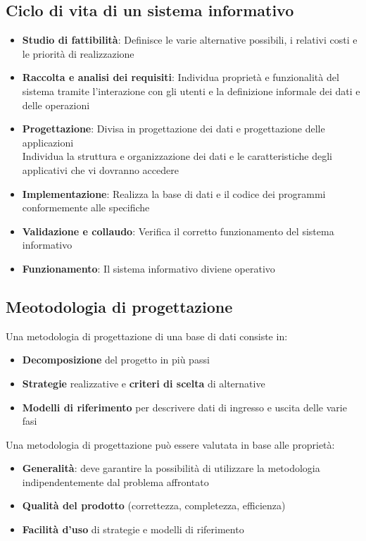 \documentclass[../main.tex]{subfiles}
\begin{document}
	\subsection{Ciclo di vita di un sistema informativo}
	\begin{itemize}
		\item \textbf{Studio di fattibilità}: Definisce le varie alternative possibili, i relativi costi e le priorità di realizzazione
		\item \textbf{Raccolta e analisi dei requisiti}: Individua proprietà e funzionalità del sistema tramite l’interazione con gli utenti e la definizione informale dei dati e delle operazioni
		\item \textbf{Progettazione}: Divisa in progettazione dei dati e progettazione delle applicazioni \\
		Individua la struttura e organizzazione dei dati e le caratteristiche degli applicativi che vi dovranno accedere
		\item \textbf{Implementazione}: Realizza la base di dati e il codice dei programmi conformemente alle specifiche
		\item \textbf{Validazione e collaudo}: Verifica il corretto funzionamento del sistema informativo
		\item \textbf{Funzionamento}: Il sistema informativo diviene operativo
	\end{itemize}
	\subsection{Meotodologia di progettazione}
	Una metodologia di progettazione di una base di dati consiste in:
	\begin{itemize}
		\item \textbf{Decomposizione} del progetto in più passi
		\item \textbf{Strategie} realizzative e \textbf{criteri di scelta} di alternative
		\item \textbf{Modelli di riferimento} per descrivere dati di ingresso e uscita delle varie fasi
	\end{itemize}
	Una metodologia di progettazione può essere valutata in base alle proprietà:
	\begin{itemize}
		\item \textbf{Generalità}: deve garantire la possibilità di utilizzare la metodologia indipendentemente dal problema affrontato
		\item \textbf{Qualità del prodotto} (correttezza, completezza, efficienza)
		\item \textbf{Facilità d’uso} di strategie e modelli di riferimento
	\end{itemize}
\end{document}
